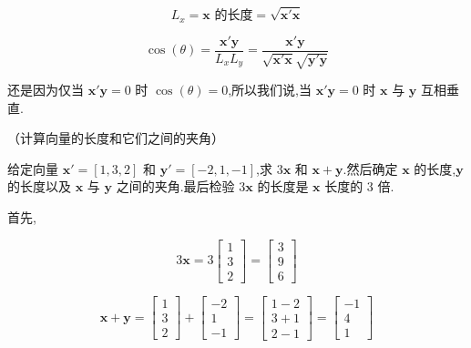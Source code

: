 \label{eq:2-5}
\begin{equation}
L_x = \bm{x} \text{ 的长度} = \sqrt{\bm{x}'\bm{x}} \tag{2-5}
\end{equation}

\label{eq:2-6}
\begin{equation}
\cos(\theta) = \frac{\bm{x}'\bm{y}}{L_xL_y} = \frac{\bm{x}'\bm{y}}{\sqrt{\bm{x}'\bm{x}}\sqrt{\bm{y}'\bm{y}}} \tag{2-6}
\end{equation}

还是因为仅当 $\bm{x}'\bm{y} = 0$ 时 $\cos(\theta) = 0$,所以我们说,当 $\bm{x}'\bm{y} = 0$ 时 $\bm{x}$ 与 $\bm{y}$ 互相垂直.

 （计算向量的长度和它们之间的夹角）

给定向量 $\bm{x}' = [1, 3, 2]$ 和 $\bm{y}' = [-2, 1, -1]$,求 $3\bm{x}$ 和 $\bm{x} + \bm{y}$.然后确定 $\bm{x}$ 的长度,$\bm{y}$ 的长度以及 $\bm{x}$ 与 $\bm{y}$ 之间的夹角.最后检验 $3\bm{x}$ 的长度是 $\bm{x}$ 长度的 3 倍.

首先,

\[
3\bm{x} = 3\begin{bmatrix} 1 \\ 3 \\ 2 \end{bmatrix} = \begin{bmatrix} 3 \\ 9 \\ 6 \end{bmatrix}
\]

\[
\bm{x} + \bm{y} = \begin{bmatrix} 1 \\ 3 \\ 2 \end{bmatrix} + \begin{bmatrix} -2 \\ 1 \\ -1 \end{bmatrix} = \begin{bmatrix} 1 - 2 \\ 3 + 1 \\ 2 - 1 \end{bmatrix} = \begin{bmatrix} -1 \\ 4 \\ 1 \end{bmatrix}
\]

